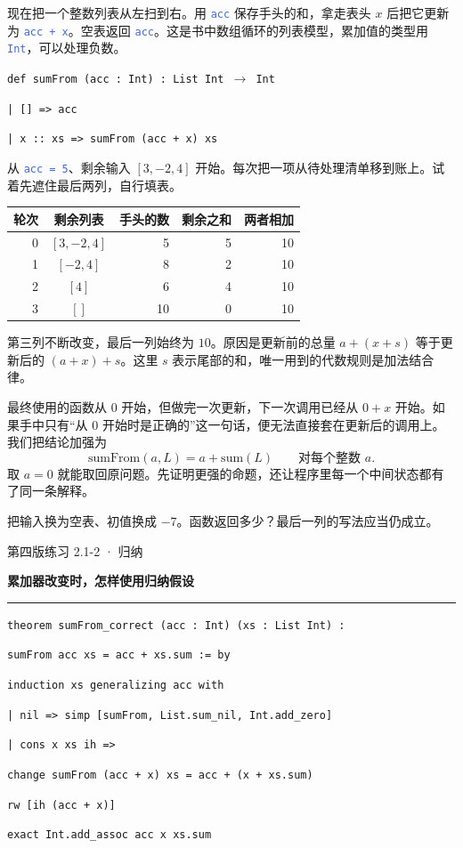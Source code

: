 \documentclass[UTF8,11pt,a4paper,fontset=fandol]{ctexart}
\newcommand{\HandoutLesson}[2]{%
  \par{\small\heiti\color{BrickRed}#1}\par\vspace{3pt}
  {\fontsize{21}{27}\selectfont\heiti\bfseries #2}\par
  \textcolor{BrickRed}{\rule{\linewidth}{.7pt}}\par}
\newcommand{\HandoutBox}[1]{%
  \par\noindent\begingroup\setlength{\fboxsep}{8pt}%
  \colorbox{BrickRed!9}{\parbox{\dimexpr\linewidth-16pt\relax}{#1}}\endgroup\par}
\newcommand{\src}[1]{\textcolor{RoyalBlue}{\texttt{#1}}}
\newcommand{\subhead}[1]{\par\vspace{3pt}{\heiti\bfseries\color{RoyalBlue}#1}\par}
\newenvironment{leanblock}{\par\smallskip\noindent\begin{lrbox}{\leanbox}\begin{minipage}{\dimexpr\linewidth-12pt\relax}\raggedright\small\setlength{\parskip}{0pt}}{\end{minipage}\end{lrbox}\colorbox{RoyalBlue!6}{\usebox{\leanbox}}\par\smallskip}
\newcommand{\lineofcode}[2]{\noindent\hspace*{#1em}\strut\texttt{#2}\par}
\begin{document}
现在把一个整数列表从左扫到右。用 \src{acc} 保存手头的和，拿走表头 $x$ 后把它更新为 \src{acc + x}。空表返回 \src{acc}。这是书中数组循环的列表模型，累加值的类型用 \src{Int}，可以处理负数。
\begin{leanblock}
\lineofcode{0.0}{def sumFrom (acc : Int) : List Int \ensuremath{\to} Int}
\lineofcode{1.0}{| [] => acc}
\lineofcode{1.0}{| x :: xs => sumFrom (acc + x) xs}
\end{leanblock}
\subhead{一笔总账，分在两个地方}
从 \src{acc = 5}、剩余输入 $[3,-2,4]$ 开始。每次把一项从待处理清单移到账上。试着先遮住最后两列，自行填表。
\begin{center}\begin{tabular}{rcrrr}\toprule
轮次 & 剩余列表 & 手头的数 & 剩余之和 & 两者相加\\\midrule
0 & $[3,-2,4]$ & 5 & 5 & 10\\
1 & $[-2,4]$ & 8 & 2 & 10\\
2 & $[4]$ & 6 & 4 & 10\\
3 & $[]$ & 10 & 0 & 10\\\bottomrule
\end{tabular}\end{center}
第三列不断改变，最后一列始终为 $10$。原因是更新前的总量 $a+(x+s)$ 等于更新后的 $(a+x)+s$。这里 $s$ 表示尾部的和，唯一用到的代数规则是加法结合律。
\subhead{为什么把初值也写进定理}
最终使用的函数从 $0$ 开始，但做完一次更新，下一次调用已经从 $0+x$ 开始。如果手中只有“从 $0$ 开始时是正确的”这一句话，便无法直接套在更新后的调用上。我们把结论加强为
\[
 \mathrm{sumFrom}(a,L)=a+\mathrm{sum}(L)\qquad \text{对每个整数 }a.
\]
取 $a=0$ 就能取回原问题。先证明更强的命题，还让程序里每一个中间状态都有了同一条解释。
\HandoutBox{把输入换为空表、初值换成 $-7$。函数返回多少？最后一列的写法应当仍成立。}
\par{}
\clearpage{}\label{p9}\HandoutLesson{第四版练习 2.1-2 · 归纳}{累加器改变时，怎样使用归纳假设}
\begin{leanblock}
\lineofcode{0.0}{theorem sumFrom\_correct (acc : Int) (xs : List Int) :}
\lineofcode{2.0}{sumFrom acc xs = acc + xs.sum := by}
\lineofcode{1.0}{induction xs generalizing acc with}
\lineofcode{1.0}{| nil => simp [sumFrom, List.sum\_nil, Int.add\_zero]}
\lineofcode{1.0}{| cons x xs ih =>}
\lineofcode{2.0}{change sumFrom (acc + x) xs = acc + (x + xs.sum)}
\lineofcode{2.0}{rw [ih (acc + x)]}
\lineofcode{2.0}{exact Int.add\_assoc acc x xs.sum}
\end{leanblock}
\end{document}
